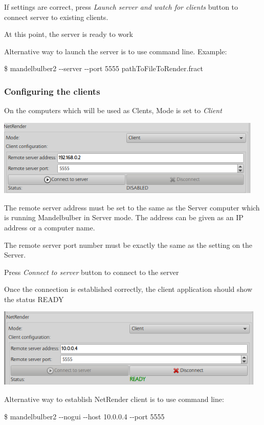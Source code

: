 If settings are correct, press \emph{Launch server and watch for clients} button
to connect server to existing clients.

At this point, the server is ready to work

Alternative way to launch the server is to use command line. Example:

\$ mandelbulber2 -\/-server -\/-port 5555 pathToFileToRender.fract

\subsubsection{Configuring the clients}\label{configuring-the-clients}

On the computers which will be used as Clents, Mode is set to \emph{Client}

\includegraphics[width=5.02441in,height=1.43071in]{img/manual/media/image28.png}

The remote server address must be set to the same as the Server computer which
is running Mandelbulber in Server mode. The address can be given as an IP
address or a computer name.

The remote server port number must be exactly the same as the setting on the
Server.

Press \emph{Connect to server} button to connect to the server

Once the connection is established correctly, the client application should show
the status READY

\includegraphics[width=5.07283in,height=1.48976in]{img/manual/media/image29.png}

Alternative way to establish NetRender client is to use command line:

\$ mandelbulber2 -\/-nogui -\/-host 10.0.0.4 -\/-port 5555

